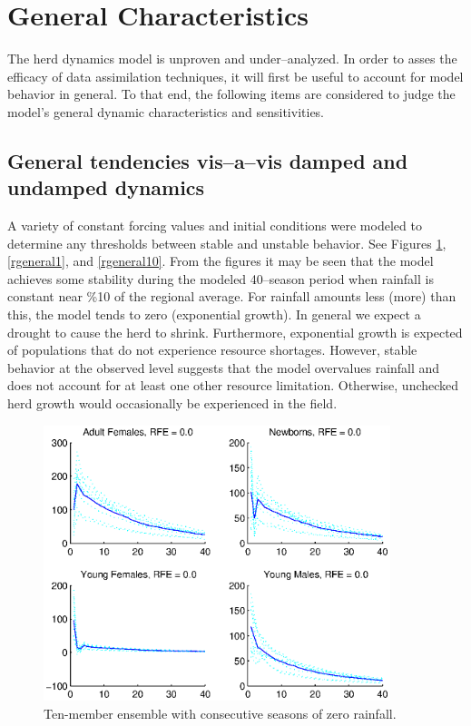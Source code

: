 \documentclass[fleqn, letterpaper]{article}
\numberwithin{figure}{section}
\begin{document}
\section{General Characteristics}
The herd dynamics model is unproven and under--analyzed. In order to asses the efficacy of data assimilation techniques, it will first be useful to account for model behavior in general. 
To that end, the following items are considered to judge the model's general dynamic characteristics and sensitivities. 

\subsection{General tendencies vis--a--vis damped and undamped dynamics}
A variety of constant forcing values and initial conditions were modeled to determine any thresholds between stable and unstable behavior.
See Figures \ref{general0}, \ref{rgeneral1}, and \ref{rgeneral10}.
From the figures it may be seen that the model achieves some stability during the modeled 40--season period when rainfall is constant near \%10 of the regional average. For rainfall amounts less (more) than this, the model tends to zero (exponential growth). In general we expect a drought to cause the herd to shrink. Furthermore, exponential growth is expected of populations that do not experience resource shortages. However, stable behavior at the observed level suggests that the model overvalues rainfall and does not account for at least one other resource limitation. Otherwise, unchecked herd growth would occasionally be experienced in the field. 
\begin{figure}
\includegraphics[width=0.9\textwidth]{general0}
\caption{Ten-member ensemble with consecutive seasons of zero rainfall.}
\label{general0}
\end{figure}
\end{document}
